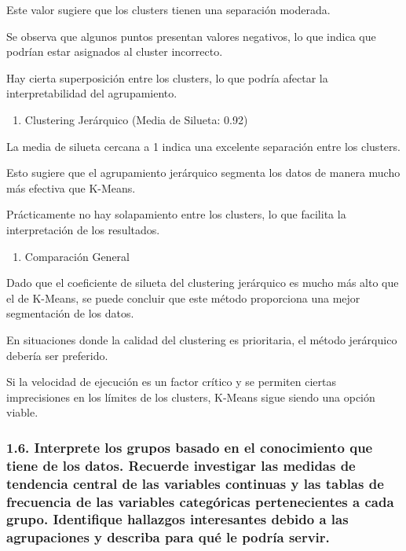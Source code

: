 \documentclass[
]{article}
\providecommand{\tightlist}{%
  \setlength{\itemsep}{0pt}\setlength{\parskip}{0pt}}
\begin{document}
Este valor sugiere que los clusters tienen una separación moderada.

Se observa que algunos puntos presentan valores negativos, lo que indica
que podrían estar asignados al cluster incorrecto.

Hay cierta superposición entre los clusters, lo que podría afectar la
interpretabilidad del agrupamiento.

\begin{enumerate}
\def\labelenumi{\arabic{enumi}.}
\setcounter{enumi}{1}
\tightlist
\item
  Clustering Jerárquico (Media de Silueta: 0.92)
\end{enumerate}

La media de silueta cercana a 1 indica una excelente separación entre
los clusters.

Esto sugiere que el agrupamiento jerárquico segmenta los datos de manera
mucho más efectiva que K-Means.

Prácticamente no hay solapamiento entre los clusters, lo que facilita la
interpretación de los resultados.

\begin{enumerate}
\def\labelenumi{\arabic{enumi}.}
\setcounter{enumi}{2}
\tightlist
\item
  Comparación General
\end{enumerate}

Dado que el coeficiente de silueta del clustering jerárquico es mucho
más alto que el de K-Means, se puede concluir que este método
proporciona una mejor segmentación de los datos.

En situaciones donde la calidad del clustering es prioritaria, el método
jerárquico debería ser preferido.

Si la velocidad de ejecución es un factor crítico y se permiten ciertas
imprecisiones en los límites de los clusters, K-Means sigue siendo una
opción viable.

\subsubsection{1.6. Interprete los grupos basado en el conocimiento que
tiene de los datos. Recuerde investigar las medidas de tendencia central
de las variables continuas y las tablas de frecuencia de las variables
categóricas pertenecientes a cada grupo. Identifique hallazgos
interesantes debido a las agrupaciones y describa para qué le podría
servir.}\label{interprete-los-grupos-basado-en-el-conocimiento-que-tiene-de-los-datos.-recuerde-investigar-las-medidas-de-tendencia-central-de-las-variables-continuas-y-las-tablas-de-frecuencia-de-las-variables-categuxf3ricas-pertenecientes-a-cada-grupo.-identifique-hallazgos-interesantes-debido-a-las-agrupaciones-y-describa-para-quuxe9-le-podruxeda-servir.}
\end{document}
